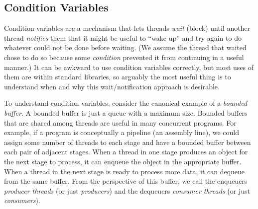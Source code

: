 \documentclass[10pt]{article}
\begin{document}
\subsection{Condition Variables}
\label{sec:condvars}

Condition variables are a mechanism that lets threads \emph{wait}
(block) until another thread \emph{notifies} them that it might be
useful to ``wake up'' and try again to do whatever could not be done
before waiting.  (We assume the thread that waited chose to do so
because some \emph{condition} prevented it from continuing in a useful
manner.)  It can be awkward to use condition variables
correctly, but most uses of them are within standard libraries, so
arguably the most useful thing is to understand when and why this
wait/notification approach is desirable.

To understand condition variables, consider the canonical example of a
\emph{bounded buffer}.  A bounded buffer is just a queue with a
maximum size.  Bounded buffers that are shared among threads are
useful in many concurrent programs.  For example, if a program is
conceptually a pipeline (an assembly line), we could assign some
number of threads to each stage and have a bounded buffer between each
pair of adjacent stages.  When a thread in one stage produces an
object for the next stage to process, it can enqueue the object in the
appropriate buffer.  When a thread in the next stage is ready to
process more data, it can dequeue from the same buffer.  From the
perspective of this buffer, we call the enqueuers \emph{producer
  threads} (or just \emph{producers}) and the dequeuers \emph{consumer
threads} (or just \emph{consumers}).  
\end{document}
